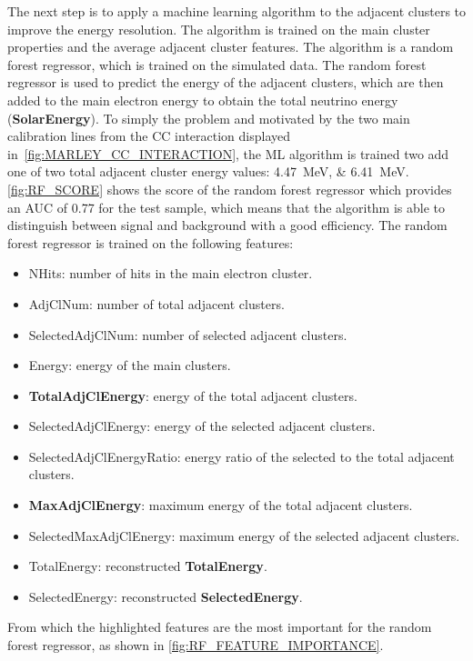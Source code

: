 The next step is to apply a machine learning algorithm to the adjacent clusters to improve the energy resolution. The algorithm is trained on the main cluster properties and the average adjacent cluster features. The algorithm is a random forest regressor, which is trained on the simulated data. The random forest regressor is used to predict the energy of the adjacent clusters, which are then added to the main electron energy to obtain the total neutrino energy (\textbf{SolarEnergy}). To simply the problem and motivated by the two main calibration lines from the \ac{CC} interaction displayed in~\cref{fig:MARLEY_CC_INTERACTION}, the \ac{ML} algorithm is trained two add one of two total adjacent cluster energy values: \qtylist{4.47;6.41}{\mega\electronvolt}. \cref{fig:RF_SCORE} shows the score of the random forest regressor which provides an AUC of \num{0.77} for the test sample, which means that the algorithm is able to distinguish between signal and background with a good efficiency. The random forest regressor is trained on the following features:

\begin{itemize}
    \item NHits: number of hits in the main electron cluster.
    \item AdjClNum: number of total adjacent clusters.
    \item SelectedAdjClNum: number of selected adjacent clusters.
    \item Energy: energy of the main clusters.
    \item \textbf{TotalAdjClEnergy}: energy of the total adjacent clusters.
    \item SelectedAdjClEnergy: energy of the selected adjacent clusters.
    \item SelectedAdjClEnergyRatio: energy ratio of the selected to the total adjacent clusters.
    \item \textbf{MaxAdjClEnergy}: maximum energy of the total adjacent clusters.
    \item SelectedMaxAdjClEnergy: maximum energy of the selected adjacent clusters.
    \item TotalEnergy: reconstructed \textbf{TotalEnergy}.
    \item SelectedEnergy: reconstructed \textbf{SelectedEnergy}.
\end{itemize}

From which the highlighted features are the most important for the random forest regressor, as shown in \cref{fig:RF_FEATURE_IMPORTANCE}.


